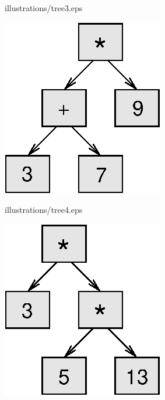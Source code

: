 illustrations/tree3.eps

\centerline{\includegraphics{illustrations/tree3.eps}}

illustrations/tree4.eps

\centerline{\includegraphics{illustrations/tree4.eps}}



